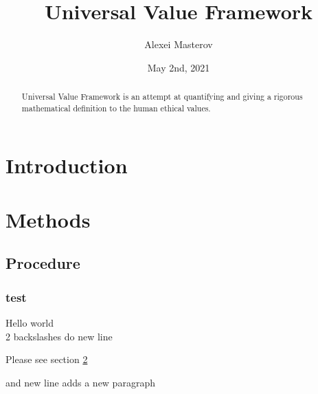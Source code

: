 \documentclass{article} %
\author{Alexei Masterov}
\title{Universal Value Framework}
\date{May 2nd, 2021}
\begin{document}
\maketitle %

\newpage
\begin{abstract}
Universal Value Framework is an attempt at quantifying and giving a rigorous mathematical definition to the human ethical values.
\end{abstract}

\newpage
\section{Introduction}

\section{Methods}\label{sec:methods}
\subsection{Procedure}
\subsubsection{test}

Hello world\\
2 backslashes do new line

Please see section \ref{sec:methods} %

and new line adds a new paragraph\cite{Schulz:2010vk}

\end{document}
